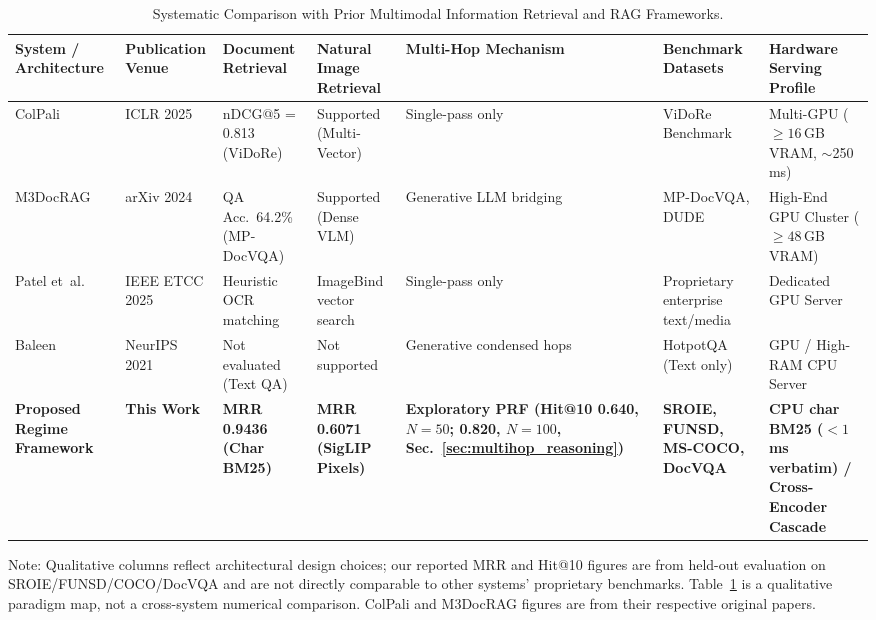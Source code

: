 \begin{table}[t]
\centering
\footnotesize
\setlength{\tabcolsep}{2.5pt}
\caption{Systematic Comparison with Prior Multimodal Information Retrieval and RAG Frameworks.}
\label{tab:sota_comparison}
\begin{tabular}{@{}p{2.2cm}p{1.6cm}p{2.2cm}p{2.0cm}p{2.3cm}p{2.0cm}p{3.7cm}@{}}
\toprule
\textbf{System / Architecture} & \textbf{Publication Venue} & \textbf{Document Retrieval} & \textbf{Natural Image Retrieval} & \textbf{Multi-Hop Mechanism} & \textbf{Benchmark Datasets} & \textbf{Hardware Serving Profile} \\ \midrule
ColPali \cite{faysse2024colpali} & ICLR 2025 & nDCG@5 = 0.813 (ViDoRe) & Supported (Multi-Vector) & Single-pass only & ViDoRe Benchmark & Multi-GPU ($\ge 16$\,GB VRAM, $\sim$250\,ms) \\
M3DocRAG \cite{cho2024m3docrag} & arXiv 2024 & QA Acc.\ 64.2\% (MP-DocVQA) & Supported (Dense VLM) & Generative LLM bridging & MP-DocVQA, DUDE & High-End GPU Cluster ($\ge 48$\,GB VRAM) \\
Patel et~al. \cite{patel2025multimodal} & IEEE ETCC 2025 & Heuristic OCR matching & ImageBind vector search & Single-pass only & Proprietary enterprise text/media & Dedicated GPU Server \\
Baleen \cite{khattab2021baleen} & NeurIPS 2021 & Not evaluated (Text QA) & Not supported & Generative condensed hops & HotpotQA (Text only) & GPU / High-RAM CPU Server \\
\textbf{Proposed Regime Framework} & \textbf{This Work} & \textbf{MRR 0.9436 (Char BM25)} & \textbf{MRR 0.6071 (SigLIP Pixels)} & \textbf{Exploratory PRF (Hit@10 0.640, $N=50$; 0.820, $N=100$, Sec.~\ref{sec:multihop_reasoning})} & \textbf{SROIE, FUNSD, MS-COCO, DocVQA} & \textbf{CPU char BM25 ($<1$\,ms verbatim) / Cross-Encoder Cascade} \\ \bottomrule
\end{tabular}
\vspace{0mm}\newline
\raggedright\scriptsize Note: Qualitative columns reflect architectural design choices; our reported MRR and Hit@10 figures are from held-out evaluation on SROIE/FUNSD/COCO/DocVQA and are not directly comparable to other systems' proprietary benchmarks. Table~\ref{tab:sota_comparison} is a qualitative paradigm map, not a cross-system numerical comparison. ColPali and M3DocRAG figures are from their respective original papers.
\end{table}

